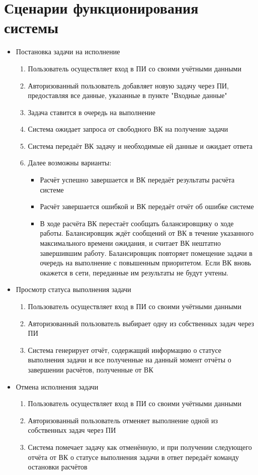 \documentclass[a4paper,12pt]{report}
\numberwithin{equation}{section}
\begin{document}
\section{Сценарии функционирования системы}
\begin{itemize}
  \item Постановка задачи на исполнение
  \begin{enumerate}
    \item Пользователь осуществляет вход в ПИ со своими учётными данными
    \item Авторизованный пользователь добавляет новую задачу через ПИ, предоставляя все данные, указанные в пункте "Входные данные"
    \item Задача ставится в очередь на выполнение
    \item Система ожидает запроса от свободного ВК на получение задачи
    \item Система передаёт ВК задачу и необходимые ей данные и ожидает ответа
    \item Далее возможны варианты:
      \begin{itemize}
        \item Расчёт успешно завершается и ВК передаёт результаты расчёта системе
        \item Расчёт завершается ошибкой и ВК передаёт отчёт об ошибке системе
        \item В ходе расчёта ВК перестаёт сообщать балансировщику о ходе работы. Балансировщик ждёт сообщений от ВК в течение указанного максимального времени ожидания, и считает ВК нештатно завершившим работу. Балансировщик повторяет помещение задачи в очередь на выполнение с повышенным приоритетом. Если ВК вновь окажется в сети, переданные им результаты не будут учтены.
      \end{itemize}
  \end{enumerate}
    
  \item Просмотр статуса выполнения задачи
  \begin{enumerate}
    \item Пользователь осуществляет вход в ПИ со своими учётными данными
    \item Авторизованный пользователь выбирает одну из собственных задач через ПИ
    \item Система генерирует отчёт, содержащий информацию о статусе выполнения задачи и все полученные на данный момент отчёты о завершении расчётов, полученные от ВК
  \end{enumerate}
  
  \item Отмена исполнения задачи
  \begin{enumerate}
    \item Пользователь осуществляет вход в ПИ со своими учётными данными
    \item Авторизованный пользователь отменяет выполнение одной из собственных задач через ПИ
    \item Система помечает задачу как отменённую, и при получении следующего отчёта от ВК о статусе выполнения задачи в ответ передаёт команду остановки расчётов
  \end{enumerate}
\end{itemize}
\end{document}
